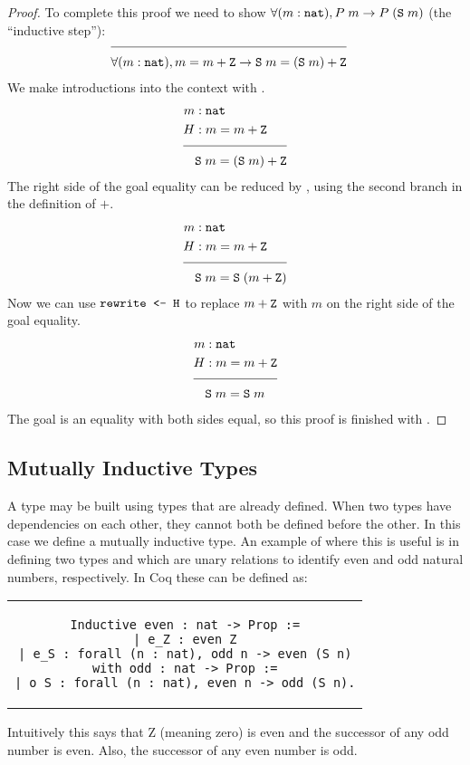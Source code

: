 \begin{expl}
\begin{proof}
To complete this proof we need to show $\forall (m : \texttt{nat}), P \; m \rightarrow P \; (\texttt{S} \; m)$ (the ``inductive step''):
\begin{align*}
\cline{1-2}
& \forall (m : \coqtm{nat}), m = m + \coqtm{Z} \rightarrow \coqtm{S} \; m = (\coqtm{S} \; m) + \coqtm{Z}
\end{align*}
We make introductions into the context with .
\begin{align*}
m &: \coqtm{nat} \\
H &: m = m + \coqtm{Z} \\[\pfshift{}]
\cline{1-2}
& \coqtm{S} \; m = (\coqtm{S} \; m) + \coqtm{Z}
\end{align*}
The right side of the goal equality can be reduced by , using the second branch in the definition of $+$.
\begin{align*}
m &: \coqtm{nat} \\
H &: m = m + \coqtm{Z} \\[\pfshift{}]
\cline{1-2}
& \coqtm{S} \; m = \coqtm{S} \; (m + \coqtm{Z})
\end{align*}
Now we can use $\texttt{rewrite <- H}$ to replace $m + \texttt{Z}$ with $m$ on the right side of the goal equality.
\begin{align*}
m &: \coqtm{nat} \\
H &: m = m + \coqtm{Z} \\[\pfshift{}]
\cline{1-2}
& \coqtm{S} \; m = \coqtm{S} \; m
\end{align*}
The goal is an equality with both sides equal, so this proof is finished with .

\end{proof}

\end{expl}

\subsection{Mutually Inductive Types}

A type may be built using types that are already defined. When two types have dependencies on each other, they cannot both be defined before the other. In this case we define a mutually inductive type. An example of where this is useful is in defining two types  and  which are unary relations to identify even and odd natural numbers, respectively. In Coq these can be defined as:
\begin{center}
\begin{tabular}{c}
\begin{lstlisting}
Inductive even : nat -> Prop :=
| e_Z : even Z
| e_S : forall (n : nat), odd n -> even (S n)
with odd : nat -> Prop :=
| o_S : forall (n : nat), even n -> odd (S n).
\end{lstlisting}
\end{tabular}
\end{center}
Intuitively this says that Z (meaning zero) is even and the successor of any odd number is even. Also, the successor of any even number is odd.

